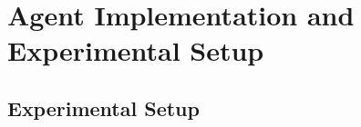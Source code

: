 






\chapter{Agent Implementation and Experimental Setup} 
\label{chapter: implementation_and_setup}




\section{Experimental Setup}
\label{sec:exp_setup}

















\newpage
